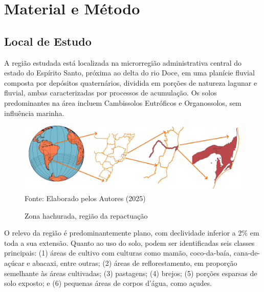 
\section{Material e Método}

 \subsection{Local de Estudo}

  \hspace*{1.25 cm}  A região estudada está localizada na microrregião administrativa central do estado do Espírito Santo, próxima ao delta do rio Doce, em uma planície fluvial composta por depósitos quaternários, dividida em porções de natureza lagunar e fluvial, ambas caracterizadas por processos de acumulação. Os solos predominantes na área incluem Cambissolos Eutróficos e Organossolos, sem influência marinha.\\
     \begin{figure}
	\begin{center}
		\centering \small \caption{Zona hachurada, região da repactuação}
		\includegraphics[width=0.96\linewidth]{FIGURAS/Localizacao}
		\label{fig:localizacado}\\{Fonte: Elaborado pelos Autores (2025)}
	\end{center}
\end{figure}
  \hspace*{1.25 cm}  O relevo da região é predominantemente plano, com declividade inferior a 2\% em toda a sua extensão. Quanto ao uso do solo, podem ser identificadas seis classes principais: (1) áreas de cultivo com culturas como mamão, coco-da-baía, cana-de-açúcar e abacaxi, entre outras; (2) áreas de reflorestamento, em proporção semelhante às áreas cultivadas; (3) pastagens; (4) brejos; (5) porções esparsas de solo exposto; e (6) pequenas áreas de corpos d’água, como açudes. \\
%


